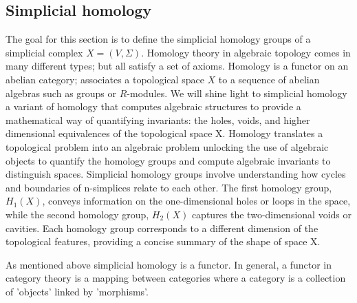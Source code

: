 \documentclass{article}
\begin{document}
\subsection{Simplicial homology}
The goal for this section is to define the simplicial homology groups of a simplicial complex $X = (V, \Sigma)$. Homology theory in algebraic topology comes in many different types; but all satisfy a set of axioms. Homology is a functor on an abelian category; associates a topological space $X$ to a sequence of abelian algebras such as groups or $R$-modules. We will shine light to simplicial homology a variant of homology that computes algebraic structures to provide a mathematical way of quantifying invariants: the holes, voids, and higher dimensional equivalences of the topological space X. Homology translates a topological problem into an algebraic problem unlocking the use of algebraic objects to quantify the homology groups and compute algebraic invariants to distinguish spaces. 
Simplicial homology groups involve understanding how cycles and boundaries of n-simplices relate to each other. The first homology group,$H_1(X)$, conveys information on the one-dimensional holes or loops in the space, while the second homology group, $H_2(X)$ captures the two-dimensional voids or cavities. Each homology group corresponds to a different dimension of the topological features, providing a concise summary of the shape of space X.

As mentioned above simplicial homology is a functor. In general, a functor in category theory is a mapping between categories where a category is a collection of 'objects' linked by 'morphisms'. 
\end{document}
